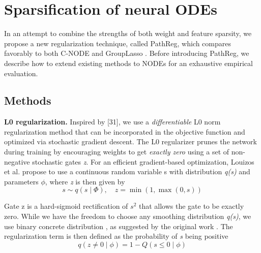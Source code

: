 \documentclass{article}
\begin{document}
\section{Sparsification of neural ODEs}
In an attempt to combine the strengths of both weight and feature sparsity, we propose a new
regularization technique, called PathReg, which compares favorably to both C-NODE \cite{Aalto2020} and
GroupLasso \cite{Montavon2019}. Before introducing PathReg, we describe how to extend existing methods to NODEs
for an exhaustive empirical evaluation.
    \subsection{Methods}
   \textbf{ L0 regularization.} Inspired by [31], we use a \textit{differentiable} L0 norm regularization method that
    can be incorporated in the objective function and optimized via stochastic gradient descent. The L0
    regularizer prunes the network during training by encouraging weights to get \textit{exactly zero} using a set
    of non-negative stochastic gates \textit{z}. For an efficient gradient-based optimization, Louizos et al. \cite{QIU2020265}
    propose to use a continuous random variable s with distribution \textit{q(s)} and parameters $\phi$, where \textit{z} is
    then given by
    \[
s \sim q(s \mid \Phi), \quad z = \min(1, \max(0, s)) \tag{4}
\]

    Gate z is a hard-sigmoid rectification of $s^{2}$
    that allows the gate to be exactly zero. While we have the
    freedom to choose any smoothing distribution \textit{q(s)}, we use binary concrete distribution \cite{louizos2018learning},\cite{kingma2017adam} as
    suggested by the original work \cite{Zhang16}. The regularization term is then defined as the probability of \textit{s}
    being positive
    \[
q(z \neq 0 \mid \phi) = 1 - Q(s \leq 0 \mid \phi) \tag{5}
\]
\end{document}
